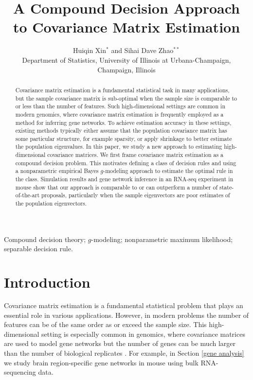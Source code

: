 \documentclass[useAMS,referee,usenatbib]{biom}
\title[Coumpound Decision Covariance Matrix Estimation]{A Compound Decision Approach to Covariance Matrix Estimation}
\author{Huiqin Xin$^{*}$\email{huiqinx2@illinois.edu } and
Sihai Dave Zhao$^{**}$\email{sdzhao@illinois.edu} \\
Department of Statistics, University of Illinois at Urbana-Champaign, Champaign, Illinois}
\begin{document}

\label{firstpage}
\begin{abstract}
  Covariance matrix estimation is a fundamental statistical task in many applications, but the sample covariance matrix is sub-optimal when the sample size is comparable to or less than the number of features. Such high-dimensional settings are common in modern genomics, where covariance matrix estimation is frequently employed as a method for inferring gene networks. To achieve estimation accuracy in these settings, existing methods typically either assume that the population covariance matrix has some particular structure, for example sparsity, or apply shrinkage to better estimate the population eigenvalues. In this paper, we study a new approach to estimating high-dimensional covariance matrices. We first frame covariance matrix estimation as a compound decision problem. This motivates defining a class of decision rules and using a nonparametric empirical Bayes $g$-modeling approach to estimate the optimal rule in the class. Simulation results and gene network inference in an RNA-seq experiment in mouse show that our approach is comparable to or can outperform a number of state-of-the-art proposals, particularly when the sample eigenvectors are poor estimates of the population eigenvectors.
\end{abstract}

\begin{keywords}
Compound decision theory; $g$-modeling; nonparametric maximum likelihood; separable decision rule.
\end{keywords}

\maketitle

\section{Introduction}
\label{introduction}

Covariance matrix estimation is a fundamental statistical problem that plays an essential role in various applications. However, in modern problems the number of features can be of the same order as or exceed the sample size. This high-dimensional setting is especially common in genomics, where covariance matrices are used to model gene networks but the number of genes can be much larger than the number of biological replicates \citep{schafer2005shrinkage, markowetz2007inferring}. For example, in Section \ref{gene analysis} we study brain region-specific gene networks in mouse using bulk RNA-sequencing data.
\end{document}
